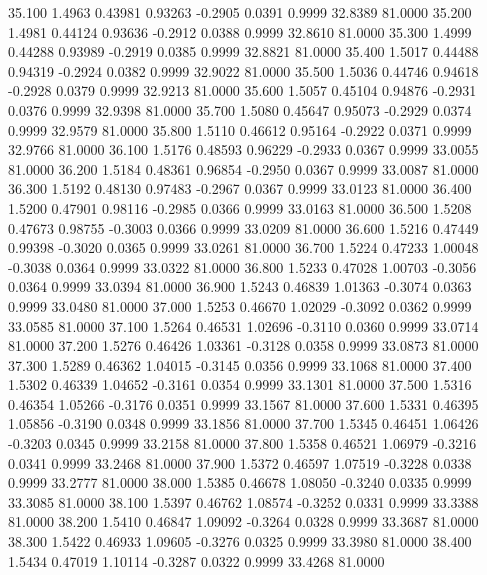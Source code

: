   35.100   1.4963   0.43981   0.93263  -0.2905   0.0391   0.9999  32.8389  81.0000
  35.200   1.4981   0.44124   0.93636  -0.2912   0.0388   0.9999  32.8610  81.0000
  35.300   1.4999   0.44288   0.93989  -0.2919   0.0385   0.9999  32.8821  81.0000
  35.400   1.5017   0.44488   0.94319  -0.2924   0.0382   0.9999  32.9022  81.0000
  35.500   1.5036   0.44746   0.94618  -0.2928   0.0379   0.9999  32.9213  81.0000
  35.600   1.5057   0.45104   0.94876  -0.2931   0.0376   0.9999  32.9398  81.0000
  35.700   1.5080   0.45647   0.95073  -0.2929   0.0374   0.9999  32.9579  81.0000
  35.800   1.5110   0.46612   0.95164  -0.2922   0.0371   0.9999  32.9766  81.0000
  36.100   1.5176   0.48593   0.96229  -0.2933   0.0367   0.9999  33.0055  81.0000
  36.200   1.5184   0.48361   0.96854  -0.2950   0.0367   0.9999  33.0087  81.0000
  36.300   1.5192   0.48130   0.97483  -0.2967   0.0367   0.9999  33.0123  81.0000
  36.400   1.5200   0.47901   0.98116  -0.2985   0.0366   0.9999  33.0163  81.0000
  36.500   1.5208   0.47673   0.98755  -0.3003   0.0366   0.9999  33.0209  81.0000
  36.600   1.5216   0.47449   0.99398  -0.3020   0.0365   0.9999  33.0261  81.0000
  36.700   1.5224   0.47233   1.00048  -0.3038   0.0364   0.9999  33.0322  81.0000
  36.800   1.5233   0.47028   1.00703  -0.3056   0.0364   0.9999  33.0394  81.0000
  36.900   1.5243   0.46839   1.01363  -0.3074   0.0363   0.9999  33.0480  81.0000
  37.000   1.5253   0.46670   1.02029  -0.3092   0.0362   0.9999  33.0585  81.0000
  37.100   1.5264   0.46531   1.02696  -0.3110   0.0360   0.9999  33.0714  81.0000
  37.200   1.5276   0.46426   1.03361  -0.3128   0.0358   0.9999  33.0873  81.0000
  37.300   1.5289   0.46362   1.04015  -0.3145   0.0356   0.9999  33.1068  81.0000
  37.400   1.5302   0.46339   1.04652  -0.3161   0.0354   0.9999  33.1301  81.0000
  37.500   1.5316   0.46354   1.05266  -0.3176   0.0351   0.9999  33.1567  81.0000
  37.600   1.5331   0.46395   1.05856  -0.3190   0.0348   0.9999  33.1856  81.0000
  37.700   1.5345   0.46451   1.06426  -0.3203   0.0345   0.9999  33.2158  81.0000
  37.800   1.5358   0.46521   1.06979  -0.3216   0.0341   0.9999  33.2468  81.0000
  37.900   1.5372   0.46597   1.07519  -0.3228   0.0338   0.9999  33.2777  81.0000
  38.000   1.5385   0.46678   1.08050  -0.3240   0.0335   0.9999  33.3085  81.0000
  38.100   1.5397   0.46762   1.08574  -0.3252   0.0331   0.9999  33.3388  81.0000
  38.200   1.5410   0.46847   1.09092  -0.3264   0.0328   0.9999  33.3687  81.0000
  38.300   1.5422   0.46933   1.09605  -0.3276   0.0325   0.9999  33.3980  81.0000
  38.400   1.5434   0.47019   1.10114  -0.3287   0.0322   0.9999  33.4268  81.0000

